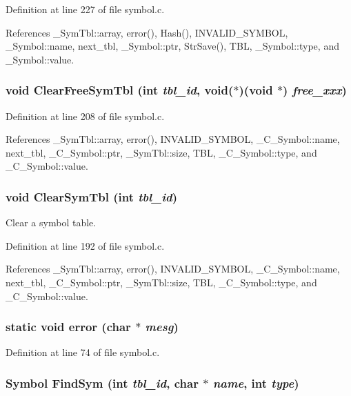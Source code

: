 Definition at line 227 of file symbol.c.

References \_\-Sym\-Tbl::array, error(), Hash(), INVALID\_\-SYMBOL, \_\-Symbol::name, next\_\-tbl, \_\-Symbol::ptr, Str\-Save(), TBL, \_\-Symbol::type, and \_\-Symbol::value.
\subsubsection{\setlength{\rightskip}{0pt plus 5cm}void Clear\-Free\-Sym\-Tbl (int {\em tbl\_\-id}, void($\ast$)(void $\ast$) {\em free\_\-xxx})}\label{symbol_8c_f622da4f3a37bf4e093a755acb5c3895}




Definition at line 208 of file symbol.c.

References \_\-Sym\-Tbl::array, error(), INVALID\_\-SYMBOL, \_\-C\_\-Symbol::name, next\_\-tbl, \_\-C\_\-Symbol::ptr, \_\-Sym\-Tbl::size, TBL, \_\-C\_\-Symbol::type, and \_\-C\_\-Symbol::value.
\subsubsection{\setlength{\rightskip}{0pt plus 5cm}void Clear\-Sym\-Tbl (int {\em tbl\_\-id})}\label{symbol_8c_ece567fd9e5204d5c8998cc4f3c266ca}


Clear a symbol table. 

Definition at line 192 of file symbol.c.

References \_\-Sym\-Tbl::array, error(), INVALID\_\-SYMBOL, \_\-C\_\-Symbol::name, next\_\-tbl, \_\-C\_\-Symbol::ptr, \_\-Sym\-Tbl::size, TBL, \_\-C\_\-Symbol::type, and \_\-C\_\-Symbol::value.
\subsubsection{\setlength{\rightskip}{0pt plus 5cm}static void error (char $\ast$ {\em mesg})\hspace{0.3cm}{\tt  [static]}}\label{symbol_8c_ee4e896cda242224d1a22f98709fcb89}




Definition at line 74 of file symbol.c.
\subsubsection{\setlength{\rightskip}{0pt plus 5cm}\bf{Symbol} Find\-Sym (int {\em tbl\_\-id}, char $\ast$ {\em name}, int {\em type})}\label{symbol_8c_4e49bf067c9691ac9d2fd412e05d8ff2}


